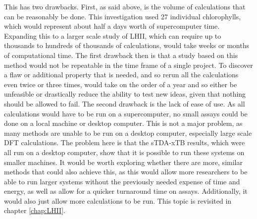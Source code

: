 This has two drawbacks. First, as said above, is the volume of calculations that
can be reasonably be done. This investigation used 27 individual chlorophylls, 
which would represent about half a days worth of supercomputer time. Expanding
this to a larger scale study of LHII, which can require up to thousands to hundreds
of thousands of calculations, would take weeks or months of computational time.
The first drawback then is that a study based on this method would not be repeatable
in the time frame of a single project. To discover a flaw or additional property 
that is needed, and so rerun all the calculations even twice or three times, would
take on the order of a year and so either be unfeasible or drastically reduce the
ability to test new ideas, given that nothing should be allowed to fail.
The second drawback is the lack of ease of use. As all calculations would have to
be run on a supercomputer, no small assays could be done on a local machine or desktop
computer. This is not a major problem, as many methods are unable to be run on a 
desktop computer, especially large scale DFT calculations. The problem here is that
the sTDA-xTB results, which were all run on a desktop computer, show that it is
possible to run these systems on smaller machines. It would be worth exploring
whether there are more, similar methods that could also achieve this, as this would
allow more researchers to be able to run larger systems without the previously needed
expense of time and energy, as well as allow for a quicker turnaround time on assays.
Additionally, it would also just allow more calculations to be run. This topic
is revisited in chapter \ref*{chap:LHII}.



